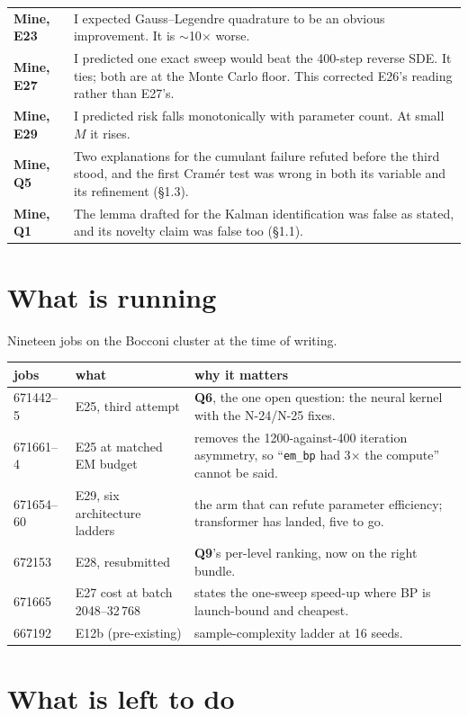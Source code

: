 \documentclass[10pt,a4paper]{article}
\newcommand{\nseq}{M}
\newcommand{\code}[1]{\texttt{\small #1}}
\newcommand{\st}[1]{\textbf{#1}}
\begin{document}
\begin{tabular}{@{}l p{11.0cm}@{}}
\st{Mine, E23} & I expected Gauss--Legendre quadrature to be an obvious improvement. It is
$\sim$10$\times$ worse. \\
\st{Mine, E27} & I predicted one exact sweep would beat the 400-step reverse SDE. It ties; both
are at the Monte Carlo floor. This corrected E26's reading rather than E27's. \\
\st{Mine, E29} & I predicted risk falls monotonically with parameter count. At small $\nseq$ it
rises. \\
\st{Mine, Q5} & Two explanations for the cumulant failure refuted before the third stood, and
the first Cramér test was wrong in both its variable and its refinement (\S1.3). \\
\st{Mine, Q1} & The lemma drafted for the Kalman identification was false as stated, and its
novelty claim was false too (\S1.1). \\
\bottomrule
\end{tabular}

\section{What is running}

Nineteen jobs on the Bocconi cluster at the time of writing.

\noindent\begin{tabular}{@{}l l p{8.4cm}@{}}
\toprule
jobs & what & why it matters \\
\midrule
671442--5 & E25, third attempt & \st{Q6}, the one open question: the neural kernel with the
N-24/N-25 fixes. \\
671661--4 & E25 at matched EM budget & removes the 1200-against-400 iteration asymmetry, so
``\code{em\_bp} had 3$\times$ the compute'' cannot be said. \\
671654--60 & E29, six architecture ladders & the arm that can refute parameter efficiency;
transformer has landed, five to go. \\
672153 & E28, resubmitted & \st{Q9}'s per-level ranking, now on the right bundle. \\
671665 & E27 cost at batch 2048--32\,768 & states the one-sweep speed-up where BP is
launch-bound and cheapest. \\
667192 & E12b (pre-existing) & sample-complexity ladder at 16 seeds. \\
\bottomrule
\end{tabular}

\section{What is left to do}
\end{document}
